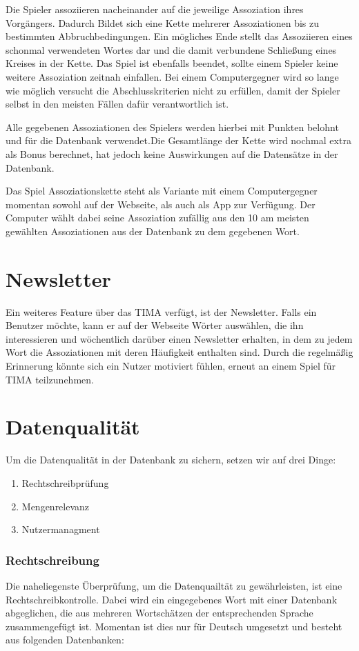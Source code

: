 Die Spieler assoziieren nacheinander auf die jeweilige Assoziation ihres
Vorgängers. Dadurch Bildet sich eine Kette mehrerer Assoziationen bis
zu bestimmten Abbruchbedingungen. Ein mögliches Ende stellt das Assoziieren
eines schonmal verwendeten Wortes dar und die damit verbundene Schließung eines
Kreises in der Kette. Das Spiel ist ebenfalls beendet, sollte einem Spieler
keine weitere Assoziation zeitnah einfallen. Bei einem Computergegner wird
so lange wie möglich versucht die Abschlusskriterien nicht zu erfüllen, damit
der Spieler selbst in den meisten Fällen dafür verantwortlich ist.

Alle gegebenen Assoziationen des Spielers werden hierbei mit Punkten belohnt
und für die Datenbank verwendet.Die Gesamtlänge der Kette wird nochmal extra
als Bonus berechnet, hat jedoch keine Auswirkungen auf die Datensätze in der
Datenbank.

Das Spiel Assoziationskette steht als Variante mit einem Computergegner
momentan sowohl auf der Webseite, als auch als App zur Verfügung. Der Computer
wählt dabei seine Assoziation zufällig aus den 10 am meisten gewählten
Assoziationen aus der Datenbank zu dem gegebenen Wort.

\section{Newsletter}\label{subsec:newsletter}
Ein weiteres Feature über das TIMA verfügt, ist der Newsletter. Falls ein
Benutzer möchte, kann er auf der Webseite Wörter auswählen, die ihn
interessieren und wöchentlich darüber einen Newsletter erhalten, in dem zu
jedem Wort die Assoziationen mit deren Häufigkeit enthalten sind. Durch die
regelmäßig Erinnerung könnte sich ein Nutzer motiviert fühlen, erneut an einem
Spiel für TIMA teilzunehmen.

\section{Datenqualität}
Um die Datenqualität  in der Datenbank zu sichern, setzen wir auf drei Dinge:

\begin{enumerate}
	\item Rechtschreibprüfung
	\item Mengenrelevanz
	\item Nutzermanagment
\end{enumerate}

\subsubsection{Rechtschreibung}
Die naheliegenste Überprüfung, um die Datenquailtät zu gewährleisten, ist eine
Rechtschreibkontrolle. Dabei wird ein eingegebenes Wort mit einer Datenbank
abgeglichen, die aus mehreren Wortschätzen der entsprechenden Sprache
zusammengefügt ist. Momentan ist dies nur für Deutsch umgesetzt und besteht aus
folgenden Datenbanken: %

